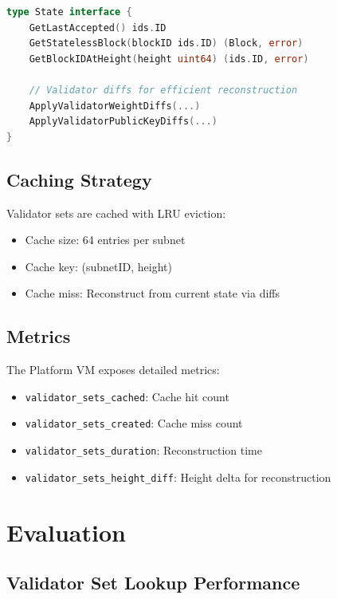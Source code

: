 \documentclass[11pt,letterpaper]{article}
\begin{document}
\begin{lstlisting}[language=Go, caption=State Management]
type State interface {
    GetLastAccepted() ids.ID
    GetStatelessBlock(blockID ids.ID) (Block, error)
    GetBlockIDAtHeight(height uint64) (ids.ID, error)

    // Validator diffs for efficient reconstruction
    ApplyValidatorWeightDiffs(...)
    ApplyValidatorPublicKeyDiffs(...)
}
\end{lstlisting}

\subsection{Caching Strategy}

Validator sets are cached with LRU eviction:

\begin{itemize}
    \item Cache size: 64 entries per subnet
    \item Cache key: (subnetID, height)
    \item Cache miss: Reconstruct from current state via diffs
\end{itemize}

\subsection{Metrics}

The Platform VM exposes detailed metrics:

\begin{itemize}
    \item \texttt{validator\_sets\_cached}: Cache hit count
    \item \texttt{validator\_sets\_created}: Cache miss count
    \item \texttt{validator\_sets\_duration}: Reconstruction time
    \item \texttt{validator\_sets\_height\_diff}: Height delta for reconstruction
\end{itemize}

\section{Evaluation}

\subsection{Validator Set Lookup Performance}
\end{document}
